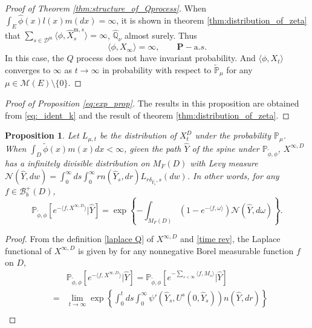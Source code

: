 \documentclass[12pt,a4paper]{amsart}
\numberwithin{equation}{section}
\theoremstyle{plain}
\newtheorem{prop}[thm]{Proposition}
\theoremstyle{definition}
\begin{document}
{\begin{proof}[Proof of Theorem \ref{thm:structure_of_Qprocess}]
  When $\int_E\widehat\phi(x)l(x)m(dx)=\infty$, it is shown in theorem \ref{thm:distribution_of_zeta} that
  $\sum_{s\in\mathcal D^{\mathrm m}} \langle \phi,\widehat X^{{\mathrm m},s}_s\rangle =\infty$, $\widehat{\mathbb Q}_\nu$ almost surely. Thus
  \[
    \langle \phi, X_{\infty}\rangle =\infty,\qquad \mathbf P-{\mathrm a.s.}
  \]
  In this case, the $Q$ process does not have invariant probability. And $\langle \phi, X_t\rangle $ converges to $\infty$ as $t\to\infty$ in probability with respect to $\widetilde{\mathbb P}_\mu$ for any $\mu\in \mathcal M(E)\setminus\{0\}$.
\end{proof}
\begin{proof}[Proof of Proposition \ref{eq:exp_prop}]
  The results in this proposition are obtained from \eqref{eq:_ident_k} and the result of theorem \ref{thm:distribution_of_zeta}.
\end{proof}
\begin{prop}\label{eq:inf_div}
  Let $L_{\mu, t}$ be the distribution of $X^D_t$ under the probability $\mathbb P_\mu$.  When $\int_D\widetilde\phi(x)m(x)dx<\infty$, given the path $\widehat Y$ of the spine under $\mathbb P_{\widetilde\phi,\phi}$,  $X^{\infty,D}$ has a infinitely divisible distribution on $M_F(D)$ with Levy measure $\mathcal N(\widehat{Y}, dw)=\int_0^\infty ds\int_0^\infty r n(\widehat{Y}_s, dr)L_{r\delta_{\widehat{Y}_s}, s}(dw)$.  In other words, for any $f\in\mathcal B_b^+(D)$,
  \[
    \mathbb P_{\widetilde\phi,\phi}\left[e^{-\langle f,X^{\infty,D}\rangle }\big|\widehat{Y}\right]=\exp\left\{-\int_{M_F(D)}(1-e^{-\langle f,\omega\rangle })\mathcal N(\widehat{Y}, d\omega)\right\}.
  \]
\end{prop}
\begin{proof}
  From the definition \eqref{laplace Q} of $X^{\infty,D}$ and \eqref{time rev}, the Laplace functional of $X^{\infty,D}$ is given by for any nonnegative Borel measurable function $f$ on $D$,
  \begin{eqnarray*}
    &&\mathbb P_{\widetilde\phi,\phi}\left[e^{-\langle f,X^{\infty,D}\rangle }\big|\widehat{Y}\right]=\mathbb P_{\widetilde\phi,\phi}\left[e^{-\sum_{s<\infty}\langle f,M_s\rangle }\big|\widehat{Y}\right]\\
    & =&\lim_{t\rightarrow\infty}\exp\left\{\int_0^tds\int_0^\infty \psi'(\widehat Y_s, U^s(0,\widehat Y_s))n(\widehat Y, dr)\right\}\\

\end{eqnarray*}
\end{proof}}
\end{document}
